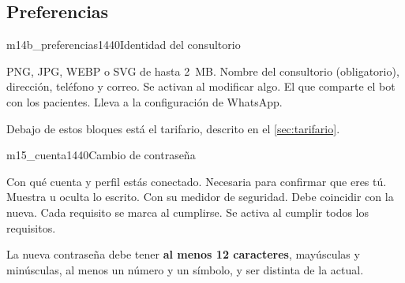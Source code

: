 \documentclass[11pt]{article}
\begin{document}
\needspace{0.55\textheight}
\subsection{Preferencias}

\begin{pantalla}{m14b_preferencias}{1440}{Identidad del consultorio}
\end{pantalla}

\begin{leyenda}
   PNG, JPG, WEBP o SVG de hasta 2~MB.
   Nombre del consultorio (obligatorio), dirección, teléfono y correo.
   Se activan al modificar algo.
   El que comparte el bot con los pacientes.
   Lleva a la configuración de WhatsApp.
\end{leyenda}

Debajo de estos bloques está el tarifario, descrito en el \cref{sec:tarifario}.

\label{sec:cuenta}


\begin{pantalla}{m15_cuenta}{1440}{Cambio de contraseña}
\end{pantalla}

\begin{leyenda}
   Con qué cuenta y perfil estás conectado.
   Necesaria para confirmar que eres tú.
   Muestra u oculta lo escrito.
   Con su medidor de seguridad.
   Debe coincidir con la nueva.
   Cada requisito se marca al cumplirse.
   Se activa al cumplir todos los requisitos.
\end{leyenda}

La nueva contraseña debe tener \textbf{al menos 12 caracteres}, mayúsculas y minúsculas, al menos un número y un símbolo, y ser distinta de la actual.
\end{document}
